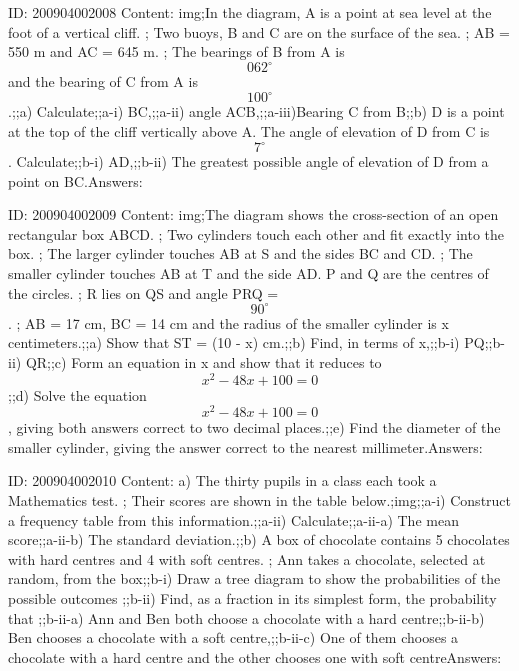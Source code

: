 \documentclass{article}
\begin{document}
ID: 200904002008
Content:
img;In the diagram, A is a point at sea level at the foot of a vertical cliff. ; Two buoys, B and C are on the surface of the sea. ; AB = 550 m and AC = 645 m. ; The bearings of B from A is $$062^{\circ}$$ and the bearing of C from A is $$100^{\circ}$$.;;a) Calculate;;a-i) BC,;;a-ii) angle ACB,;;a-iii)Bearing C from B;;b) D is a point at the top of the cliff vertically above A. The angle of elevation of D from C is $$7^{\circ}$$. Calculate;;b-i) AD,;;b-ii) The greatest possible angle of elevation of D from a point on BC.Answers:

ID: 200904002009
Content:
img;The diagram shows the cross-section of an open rectangular box ABCD. ; Two cylinders touch each other and fit exactly into the box. ; The larger cylinder touches AB at S and the sides BC and CD. ; The smaller cylinder touches AB at T and the side AD. P and Q are the centres of the circles. ; R lies on QS and angle PRQ = $$90^{\circ}$$. ; AB = 17 cm, BC = 14 cm and the radius of the smaller cylinder is x centimeters.;;a) Show that ST = (10 - x) cm.;;b) Find, in terms of x,;;b-i) PQ;;b-ii) QR;;c) Form an equation in x and show that it reduces to $$x^2 - 48x + 100 = 0$$;;d) Solve the equation $$x^2 - 48x + 100 = 0$$, giving both answers correct to two decimal places.;;e) Find the diameter of the smaller cylinder, giving the answer correct to the nearest millimeter.Answers:

ID: 200904002010
Content:
a) The thirty pupils in a class each took a Mathematics test. ; Their scores are shown in the table below.;img;;a-i) Construct a frequency table from this information.;;a-ii) Calculate;;a-ii-a) The mean score;;a-ii-b) The standard deviation.;;b) A box of chocolate contains 5 chocolates with hard centres and 4 with soft centres. ; Ann takes a chocolate, selected at random, from the box;;b-i) Draw a tree diagram to show the probabilities of the possible outcomes ;;b-ii) Find, as a fraction in its simplest form, the probability that ;;b-ii-a) Ann and Ben both choose a chocolate with a hard centre;;b-ii-b) Ben chooses a chocolate with a soft centre,;;b-ii-c) One of them chooses a chocolate with a hard centre and the other chooses one with soft centreAnswers:
\end{document}
